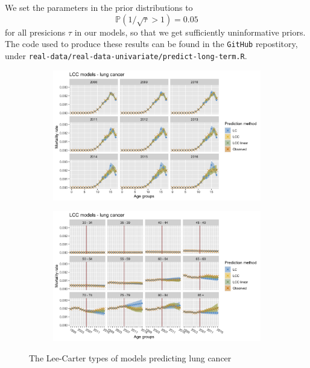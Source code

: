 We set the parameters in the prior distributions to
\begin{equation*}
    \mathbb{P}(1/\sqrt{\tau} > 1) = 0.05
\end{equation*}
for all presicions $\tau$ in our models, so that we get sufficiently uninformative priors. The code used to produce these results can be found in the \texttt{GitHub} repostitory, under \texttt{real-data/real-data-univariate/predict-long-term.R}. 

\begin{figure}[h!]
    \centering
    \begin{subfigure}[b]{.45\linewidth}
        \includegraphics[width=\linewidth]{real-data/real-data-univariate/Figures/univariate-LCC-by-age-lung.png}
    \end{subfigure}
    \begin{subfigure}[b]{.45\linewidth}
        \includegraphics[width=\linewidth]{real-data/real-data-univariate/Figures/univariate-LCC-by-period-lung.png}
    \end{subfigure}
    \caption{The Lee-Carter types of models predicting lung cancer}
    \label{fig:uv-LCC-lung}
\end{figure}

